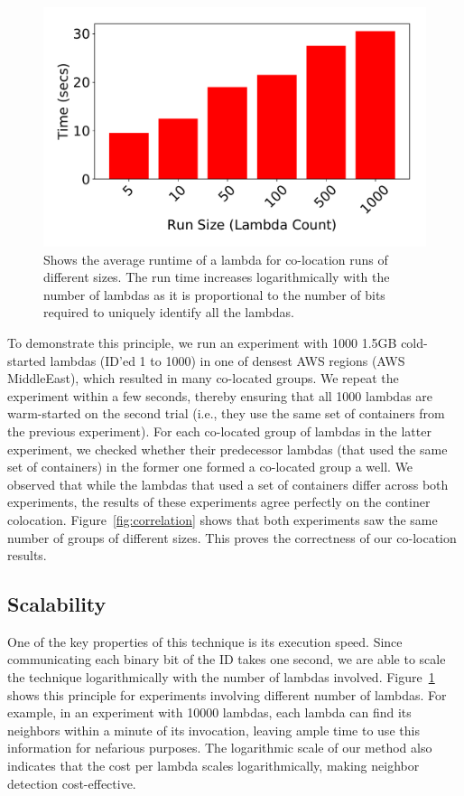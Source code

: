 \begin{figure}[!t]
  \includegraphics[width=.99\linewidth]{fig/runtimes.pdf}
  \caption{Shows the average runtime of a lambda for co-location runs of different sizes. 
  The run time increases logarithmically with the number of lambdas as it is proportional to
  the number of bits required to uniquely identify all the lambdas.
\label{fig:runtimes}}
\end{figure}

To demonstrate this principle, we run an experiment with 1000 1.5GB cold-started
lambdas (ID'ed 1 to 1000) in one of densest AWS regions (AWS MiddleEast), which
resulted in many co-located groups.  We repeat the experiment within a few
seconds, thereby ensuring that all 1000 lambdas are warm-started on the second
trial (i.e., they use the same set of containers from the previous experiment).
For each co-located group of lambdas in the latter experiment, we checked
whether their predecessor lambdas (that used the same set of containers) in the former one 
formed a co-located group a well.   
We observed that while the lambdas that used a set of containers differ across 
both experiments, the results of these experiments agree perfectly on the continer 
colocation. Figure~\ref{fig:correlation} shows that both experiments saw
the same number of groups of different sizes. This proves the correctness of
our co-location results.

\subsection{Scalability}
One of the key properties of this technique is its execution speed.  Since
communicating each binary bit of the ID takes one second, we are able to scale
the technique logarithmically with the number of lambdas involved.
Figure~\ref{fig:runtimes} shows this principle for experiments involving
different number of lambdas. For example, in an experiment with 10000 lambdas,
each lambda can find its neighbors within a minute of its invocation, leaving
ample time to use this information for nefarious purposes. The logarithmic scale
of our method also indicates that the cost per lambda scales logarithmically,
making neighbor detection cost-effective.



